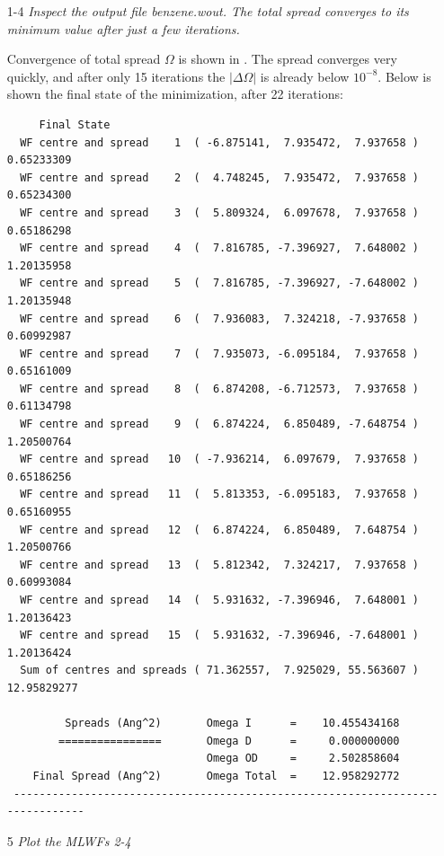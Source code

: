\begin{itemize}
\item[1-4] {\it Inspect the output file benzene.wout. The total spread converges to its minimum value after just a
few iterations.}

Convergence of total spread $\Omega$ is shown in . The spread converges very quickly, and after only 15 iterations the $|\Delta\Omega|$ is already below $10^{-8}$.
Below is shown the final state of the minimization, after 22 iterations:
  \begin{tcolorbox}[sharp corners,boxrule=0.5pt]
  {\small
	\begin{verbatim}
	 Final State
  WF centre and spread    1  ( -6.875141,  7.935472,  7.937658 )     0.65233309
  WF centre and spread    2  (  4.748245,  7.935472,  7.937658 )     0.65234300
  WF centre and spread    3  (  5.809324,  6.097678,  7.937658 )     0.65186298
  WF centre and spread    4  (  7.816785, -7.396927,  7.648002 )     1.20135958
  WF centre and spread    5  (  7.816785, -7.396927, -7.648002 )     1.20135948
  WF centre and spread    6  (  7.936083,  7.324218, -7.937658 )     0.60992987
  WF centre and spread    7  (  7.935073, -6.095184,  7.937658 )     0.65161009
  WF centre and spread    8  (  6.874208, -6.712573,  7.937658 )     0.61134798
  WF centre and spread    9  (  6.874224,  6.850489, -7.648754 )     1.20500764
  WF centre and spread   10  ( -7.936214,  6.097679,  7.937658 )     0.65186256
  WF centre and spread   11  (  5.813353, -6.095183,  7.937658 )     0.65160955
  WF centre and spread   12  (  6.874224,  6.850489,  7.648754 )     1.20500766
  WF centre and spread   13  (  5.812342,  7.324217,  7.937658 )     0.60993084
  WF centre and spread   14  (  5.931632, -7.396946,  7.648001 )     1.20136423
  WF centre and spread   15  (  5.931632, -7.396946, -7.648001 )     1.20136424
  Sum of centres and spreads ( 71.362557,  7.925029, 55.563607 )    12.95829277
 
         Spreads (Ang^2)       Omega I      =    10.455434168
        ================       Omega D      =     0.000000000
                               Omega OD     =     2.502858604
    Final Spread (Ang^2)       Omega Total  =    12.958292772
 ------------------------------------------------------------------------------
	\end{verbatim}
	}
	\end{tcolorbox}

\item[5] {\it Plot the MLWFs 2-4}


\end{itemize}
